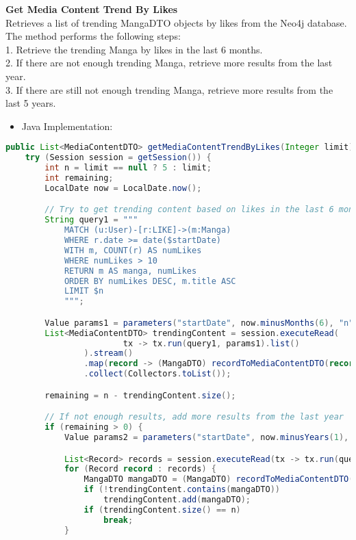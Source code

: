 \textbf{Get Media Content Trend By Likes}\\
Retrieves a list of trending MangaDTO objects by likes from the Neo4j database.
The method performs the following steps:\\
1. Retrieve the trending Manga by likes in the last 6 months.\\
2. If there are not enough trending Manga, retrieve more results from the last year.\\
3. If there are still not enough trending Manga, retrieve more results from the last 5 years.\\
\begin{itemize}
    \item Java Implementation:
\end{itemize}

\begin{mdframed}[style=customstyle]
\begin{lstlisting}[language=java]
public List<MediaContentDTO> getMediaContentTrendByLikes(Integer limit) throws DAOException {
    try (Session session = getSession()) {
        int n = limit == null ? 5 : limit;
        int remaining;
        LocalDate now = LocalDate.now();

        // Try to get trending content based on likes in the last 6 months
        String query1 = """
            MATCH (u:User)-[r:LIKE]->(m:Manga)
            WHERE r.date >= date($startDate)
            WITH m, COUNT(r) AS numLikes
            WHERE numLikes > 10
            RETURN m AS manga, numLikes
            ORDER BY numLikes DESC, m.title ASC
            LIMIT $n
            """;

        Value params1 = parameters("startDate", now.minusMonths(6), "n", n);
        List<MediaContentDTO> trendingContent = session.executeRead(
                        tx -> tx.run(query1, params1).list()
                ).stream()
                .map(record -> (MangaDTO) recordToMediaContentDTO(record))
                .collect(Collectors.toList());

        remaining = n - trendingContent.size();

        // If not enough results, add more results from the last year
        if (remaining > 0) {
            Value params2 = parameters("startDate", now.minusYears(1), "n", remaining);

            List<Record> records = session.executeRead(tx -> tx.run(query1, params2).list());
            for (Record record : records) {
                MangaDTO mangaDTO = (MangaDTO) recordToMediaContentDTO(record);
                if (!trendingContent.contains(mangaDTO))
                    trendingContent.add(mangaDTO);
                if (trendingContent.size() == n)
                    break;
            }


\end{lstlisting}
\end{mdframed}
